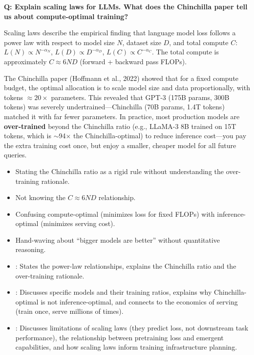\begin{interviewq}
\textbf{Q: Explain scaling laws for LLMs. What does the Chinchilla paper
tell us about compute-optimal training?}

 \quad {} \quad
\badgefreq{\freqhigh}

\stronganswer
Scaling laws describe the empirical finding that language model loss follows
a power law with respect to model size $N$, dataset size $D$, and total
compute $C$: $L(N) \propto N^{-\alpha_N}$, $L(D) \propto D^{-\alpha_D}$,
$L(C) \propto C^{-\alpha_C}$.  The total compute is approximately
$C \approx 6ND$ (forward + backward pass FLOPs).

The Chinchilla paper (Hoffmann et al., 2022) showed that for a fixed compute
budget, the optimal allocation is to scale model size and data proportionally,
with tokens $\approx 20\times$ parameters.  This revealed that GPT-3 (175B
params, 300B tokens) was severely undertrained---Chinchilla (70B params, 1.4T
tokens) matched it with far fewer parameters.  In practice, most production
models are \textbf{over-trained} beyond the Chinchilla ratio (e.g., LLaMA-3 8B
trained on 15T tokens, which is $\sim$94$\times$ the Chinchilla-optimal) to
reduce inference cost---you pay the extra training cost once, but enjoy a
smaller, cheaper model for all future queries.

\redflags
\begin{itemize}
\item Stating the Chinchilla ratio as a rigid rule without understanding
  the over-training rationale.
\item Not knowing the $C \approx 6ND$ relationship.
\item Confusing compute-optimal (minimizes loss for fixed FLOPs) with
  inference-optimal (minimizes serving cost).
\item Hand-waving about ``bigger models are better'' without quantitative
  reasoning.
\end{itemize}


\goodgreat
\begin{itemize}
\item {}: States the power-law relationships, explains the
  Chinchilla ratio and the over-training rationale.
\item {}: Discusses specific models and their training ratios,
  explains why Chinchilla-optimal is not inference-optimal, and connects
  to the economics of serving (train once, serve millions of times).
\item {}: Discusses limitations of scaling laws (they predict
  loss, not downstream task performance), the relationship between
  pretraining loss and emergent capabilities, and how scaling laws inform
  training infrastructure planning.
\end{itemize}


\end{interviewq}
